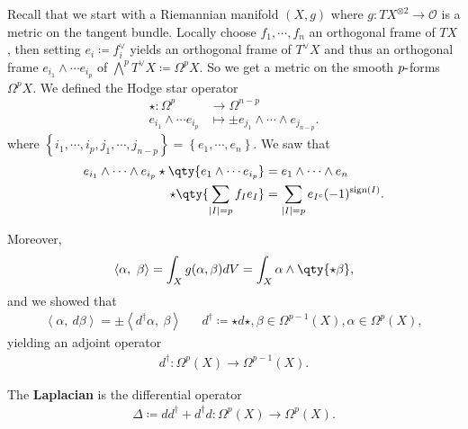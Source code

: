 \begin{remark}

Recall that we start with a Riemannian manifold \((X, g)\) where
\(g: TX^{\otimes 2} \to {\mathcal{O}}\) is a metric on the tangent
bundle. Locally choose \(f_1,\cdots, f_n\) an orthogonal frame of
\(TX\), then setting \(e_i \coloneqq f_i^\vee\) yields an orthogonal
frame of \(T^\vee X\) and thus an orthogonal frame
\(e_{i_1} \wedge \cdots e_{i_p}\) of
\(\bigwedge^p T^\vee X \coloneqq\Omega^p X\). So we get a metric on the
smooth \(p{\hbox{-}}\)forms \(\Omega^p X\). We defined the Hodge star
operator
\begin{align*}
\star: \Omega^p &\to \Omega^{n-p} \\
e_{i_1} \wedge \cdots e_{i_p} &\mapsto \pm e_{j_1} \wedge \cdots \wedge e_{j_{n-p}}
.\end{align*}
where
\(\left\{{ i_1, \cdots, i_p, j_1, \cdots, j_{n-p} }\right\} = \left\{{ e_1, \cdots, e_n }\right\}\).
We saw that
\begin{align*}
e_{i_1} \wedge \cdots \wedge e_{i_p} \star\qty{ e_1 \wedge \cdots e_{i_p}} &= e_1 \wedge \cdots \wedge e_n \\
\star\qty{ \sum_{{\left\lvert {I} \right\rvert} = p } f_I e_I} &= \sum_{ {\left\lvert {I} \right\rvert} = p} e_{I^c} (-1)^{\operatorname{sign}(I)}
.\end{align*}

Moreover,
\begin{align*}
{\left\langle { \alpha},~{ \beta} \right\rangle} = \int_X g( \alpha, \beta) dV = \int_X \alpha\wedge \qty{\star\beta}
,\end{align*}
and we showed that
\begin{align*}
{\left\langle { \alpha},~{ d \beta} \right\rangle} = \pm {\left\langle { d^\dagger \alpha},~{ \beta} \right\rangle}
&& 
d^\dagger \coloneqq\star d \star, \beta\in \Omega^{p-1}(X), \alpha\in \Omega^p(X)
,\end{align*}
yielding an adjoint operator
\begin{align*}
d^\dagger: \Omega^p(X) \to \Omega^{p-1}(X)
.\end{align*}

\end{remark}

\begin{definition}[Laplacian]

The \textbf{Laplacian} is the differential operator
\begin{align*}
\Delta \coloneqq dd^\dagger + d^\dagger d: \Omega^p(X) \to \Omega^p(X)
.\end{align*}

\end{definition}

